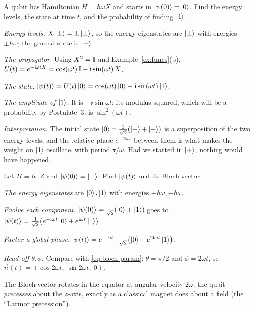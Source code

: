 \begin{example}\label{ex:H-eq-X}
  A qubit has Hamiltonian $H=\hbar\omega X$ and starts in $\left|\psi(0)\right\rangle=\left|0\right\rangle$. Find the energy levels, the state at time $t$, and the probability of finding $\left|1\right\rangle$.
\end{example}
\begin{solution}
  \begin{steps}
    \item \emph{Energy levels.} $X\left|\pm\right\rangle=\pm\left|\pm\right\rangle$, so the energy eigenstates are $\left|\pm\right\rangle$ with energies $\pm\hbar\omega$; the ground state is $\left|-\right\rangle$.
    \item \emph{The propagator.} Using $X^2=\mathbb{I}$ and Example~\ref{ex:funcs}(b), $U(t)=e^{-\mathrm{i}\omega tX}=\cos(\omega t)\,\mathbb{I}-\mathrm{i}\sin(\omega t)\,X$.
    \item \emph{The state.} $\left|\psi(t)\right\rangle=U(t)\left|0\right\rangle=\cos(\omega t)\left|0\right\rangle-\mathrm{i}\sin(\omega t)\left|1\right\rangle$.
    \item \emph{The amplitude of $\left|1\right\rangle$.} It is $-\ii\sin\omega t$; its modulus squared, which will be a probability by Postulate~3, is $\sin^2(\omega t)$.
    \item \emph{Interpretation.} The initial state $\left|0\right\rangle=\frac1{\sqrt2}(\left|+\right\rangle+\left|-\right\rangle)$ is a superposition of the two energy levels, and the relative phase $e^{-2\ii\omega t}$ between them is what makes the weight on $\left|1\right\rangle$ oscillate, with period $\pi/\omega$. Had we started in $\left|+\right\rangle$, nothing would have happened.
  \end{steps}
\end{solution}

\begin{example}\label{ex:precession}
  Let $H=\hbar\omega Z$ and $\left|\psi(0)\right\rangle=\left|+\right\rangle$. Find $\left|\psi(t)\right\rangle$ and its Bloch vector.
\end{example}
\begin{solution}
  \begin{steps}
    \item \emph{The energy eigenstates} are $\left|0\right\rangle,\left|1\right\rangle$ with energies $+\hbar\omega,-\hbar\omega$.
    \item \emph{Evolve each component.} $\left|\psi(0)\right\rangle=\frac1{\sqrt2}(\left|0\right\rangle+\left|1\right\rangle)$ goes to $\left|\psi(t)\right\rangle=\frac1{\sqrt2}\bigl(e^{-\mathrm{i}\omega t}\left|0\right\rangle+e^{\mathrm{i}\omega t}\left|1\right\rangle\bigr)$.
    \item \emph{Factor a global phase.} $\left|\psi(t)\right\rangle=e^{-\mathrm{i}\omega t}\cdot\frac1{\sqrt2}\bigl(\left|0\right\rangle+e^{2\mathrm{i}\omega t}\left|1\right\rangle\bigr)$.
    \item \emph{Read off $\theta,\phi$.} Compare with \eqref{eq:bloch-param}: $\theta=\pi/2$ and $\phi=2\omega t$, so $\vec n(t)=(\cos2\omega t,\ \sin2\omega t,\ 0)$.
  \end{steps}
  The Bloch vector rotates in the equator at angular velocity $2\omega$: the qubit \emph{precesses} about the $z$-axis, exactly as a classical magnet does about a field (the ``Larmor precession'').
\end{solution}

